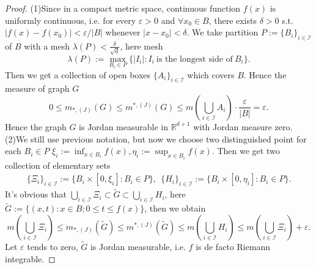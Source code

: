 \documentclass{article}
\begin{document}
\begin{ex}\end{ex}
\begin{proof}
(1)Since in a compact metric space, continuous function $f(x)$ is uniformly continuous, i.e. for every $\varepsilon > 0$
and $\forall x_0 \in B$, there exists $\delta > 0$ s.t. $|f(x) - f(x_0)| < \varepsilon / |B|$ whenever $|x - x_0| < \delta$.
We take partition $P:= \{B_i\}_{i \in \mathcal{I}}$ of $B$ with a mesh $\lambda(P) < \frac{\delta}{\sqrt{d}}$, here mesh 
$$\lambda(P) := \max_{B_i \in P} \{|I_i| : I_i\ \text{is the longest side of}\ B_i\}.$$
Then we get a collection of open boxes $\{A_i\}_{i \in \mathcal{I}}$ which covers $B$. Hence the measure of graph $G$ $$
0 \leq m_{*,(J)}(G) \leq m^{*, (J)}(G) \leq m\left( \bigcup_{i \in \mathcal{I}} A_i \right) \cdot \frac{\varepsilon}{|B|} = \varepsilon.
$$Hence the graph $G$ is Jordan measurable in $\mathbb{R}^{d + 1}$ with Jordan measure zero.\\
(2)We still use previous notation, but now we choose two distinguished point for each $B_i \in P$
$\xi_i := \inf_{x \in B_i} f(x), \eta_i := \sup_{x \in B_i} f(x)$. Then we get two collection of elementary sets \begin{gather*}
\{\Xi_i\}_{i \in \mathcal{I}} := \{B_i \times [0, \xi_i]: B_i \in P\}, \ \ 
\{H_i\}_{i \in \mathcal{I}} := \{B_i \times [0, \eta_i]: B_i \in P\}.
\end{gather*}
It's obvious that $\bigcup_{i \in \mathcal{I}} \Xi_i \subset \tilde{G} \subset \bigcup_{i \in \mathcal{I}} H_i$, here
$\tilde{G} := \{(x, t) : x \in B; 0 \leq t \leq f(x)\}$, then we obtain$$
m\left( \bigcup_{i \in \mathcal{I}} \Xi_i \right) \leq m_{*,(J)}(\tilde{G}) \leq m^{*,(J)}(\tilde{G})
\leq m\left( \bigcup_{i \in \mathcal{I}} H_i \right) \leq m\left( \bigcup_{i \in \mathcal{I}} \Xi_i \right) + \varepsilon.
$$Let $\varepsilon$ tends to zero, $\tilde{G}$ is Jordan measurable, i.e. $f$ is de facto Riemann integrable.
\end{proof}
\end{document}
